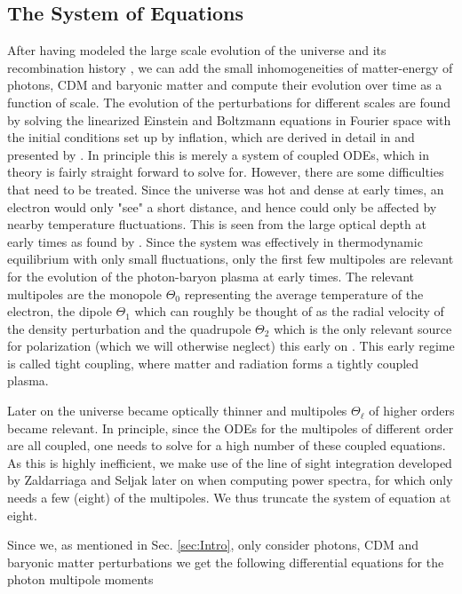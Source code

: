\documentclass[twocolumn]{aastex62}
\begin{document}
\subsection{The System of Equations} \label{subsec:system}
After having modeled the large scale evolution \citep{stutzer:2020a} of the universe and its recombination history \citep{stutzer:2020b}, we can add the small inhomogeneities of matter-energy of photons, CDM and baryonic matter and compute their evolution over time as a function of scale. The evolution of the perturbations for different scales are found by solving the linearized Einstein and Boltzmann equations in Fourier space with the initial conditions set up by inflation, which are derived in detail in \cite{dodelson:2003} and presented by \cite{winther:2020b}. In principle this is merely a system of coupled ODEs, which in theory is fairly straight forward to solve for. However, there are some difficulties that need to be treated. Since the universe was hot and dense at early times, an electron would only "see" a short distance, and hence could only be affected by nearby temperature fluctuations. This is seen from the large optical depth at early times as found by \cite{stutzer:2020b}. Since the system was effectively in thermodynamic equilibrium with only small fluctuations, only the first few multipoles are relevant for the evolution of the photon-baryon plasma at early times. The relevant multipoles are the monopole $\Theta_0$ representing the average temperature of the electron, the dipole $\Theta_1$ which can roughly be thought of as the radial velocity of the density perturbation and the quadrupole $\Theta_2$ which is the only relevant source for polarization (which we will otherwise neglect) this early on \citep[]{winther:2020b}. This early regime is called tight coupling, where matter and radiation forms a tightly coupled plasma.

Later on the universe became optically thinner and multipoles $\Theta_\ell$ of higher orders became relevant. In principle, since the ODEs for the multipoles of different order are all coupled, one needs to solve for a high number of these coupled equations. As this is highly inefficient, we make use of the line of sight integration developed by Zaldarriaga and Seljak later on when computing power spectra, for which only needs a few (eight) of the multipoles. We thus truncate the system of equation at eight.

Since we, as mentioned in Sec. \ref{sec:Intro}, only consider photons, CDM and baryonic matter perturbations we get the following differential equations for the photon multipole moments
\end{document}

